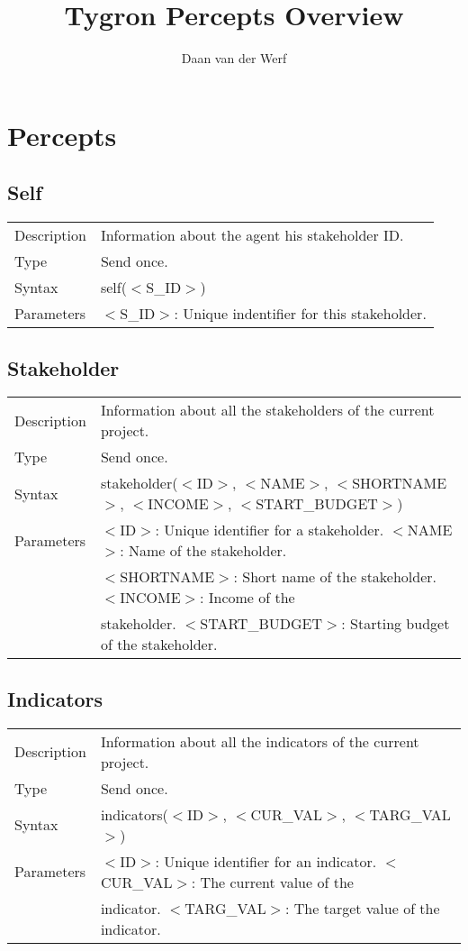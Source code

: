 \documentclass{article}
\author{Daan van der Werf}
\title{Tygron Percepts Overview}
\begin{document}
\maketitle{}
\newpage

\section*{Percepts}

\subsection*{Self}

\begin{tabular}{ l l }
  Description & Information about the agent his stakeholder ID.  \\
  Type & Send once. \\
  Syntax & self($<$S\_ID$>$) \\
  Parameters & $<$S\_ID$>$: Unique indentifier for this stakeholder.

\end{tabular}

\subsection*{Stakeholder}

\begin{tabular}{ l l }
  Description & Information about all the stakeholders of the current project.  \\
  Type & Send once. \\
  Syntax & stakeholder($<$ID$>$, $<$NAME$>$, $<$SHORTNAME$>$, $<$INCOME$>$, $<$START\_BUDGET$>$) \\
  Parameters &  $<$ID$>$: Unique identifier for a stakeholder. $<$NAME$>$: Name of the stakeholder. \\
   & $<$SHORTNAME$>$: Short name of the stakeholder. $<$INCOME$>$: Income of the \\
   & stakeholder. $<$START\_BUDGET$>$: Starting budget of the stakeholder.
\end{tabular}

\subsection*{Indicators}

\begin{tabular}{ l l }
  Description & Information about all the indicators of the current project.  \\
  Type & Send once. \\
  Syntax & indicators($<$ID$>$, $<$CUR\_VAL$>$, $<$TARG\_VAL$>$) \\
  Parameters &  $<$ID$>$: Unique identifier for an indicator. $<$CUR\_VAL$>$: The current value of the \\
    & indicator. $<$TARG\_VAL$>$: The target value of the indicator. 
\end{tabular}
\end{document}
